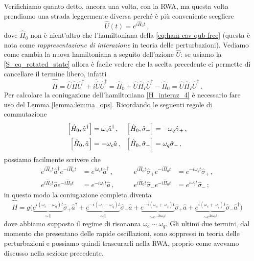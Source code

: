 \noindent Verifichiamo quanto detto, ancora una volta, con la RWA, ma questa volta prendiamo una strada leggermente diversa perché è più conveniente scegliere
\begin{equation*}
    \hat U(t) = e^{i\hat H_0 t} \, ,
\end{equation*}
dove $\hat H_0$ non è nient'altro che l'hamiltoniana della \eqref{eq:ham-cav-qub-free} (questa è nota come \textit{rappresentazione di interazione} in teoria delle perturbazioni). Vediamo come cambia la nuova hamiltoniana a seguito dell'azione $\hat U$: se usiamo la \eqref{S_eq_rotated_state} allora è facile vedere che la scelta precedente ci permette di cancellare il termine libero, infatti
\begin{equation*}
    \hat{\tilde{H}} = \hat U \hat H \hat U^\dagger + i\dot{\hat U}\hat U^\dagger=\hat H_0 + \hat U \hat H_I \hat U^\dagger - \hat H_0= \hat U \hat H_I \hat U^\dagger \, .
\end{equation*}
Per calcolare la coniugazione dell'hamiltoniana \eqref{H_interaz_4} è necessario fare uso del Lemma \ref{lemma:lemma_ops}. Ricordando le seguenti regole di commutazione
\begin{align*}
    \comm{\hat H_0}{\hat a^\dagger} &= \omega_c \hat a^\dagger \, , 
    &\comm{\hat H_0}{\hat \sigma_+} &= -\omega_q\hat \sigma_+ \, , \\
    \comm{\hat H_0}{\hat a} &= -\omega_c \hat a \, , &\comm{\hat H_0}{\hat \sigma_-} &= \omega_q\hat \sigma_- \, ,
\end{align*}
possiamo facilmente scrivere che
\begin{equation}\label{RWA_ops_trans}
    \begin{aligned}
    e^{i\hat H_0t} \hat a^\dagger e^{-i\hat H_0t} &= e^{i\omega_ct} \hat a^\dagger \, , \qquad
    &e^{i\hat H_0t} \hat \sigma_+ e^{-i\hat H_0t} &= e^{-i\omega_qt} \hat \sigma_+ \, , \\
    e^{i\hat H_0t} \hat a e^{-i\hat H_0t} &= e^{-i\omega_ct} \hat a \, , \qquad
    &e^{i\hat H_0t} \hat \sigma_- e^{-i\hat H_0t} &= e^{i\omega_qt} \hat \sigma_- \, ;
    \end{aligned}
\end{equation}
in questo modo la coniugazione completa diventa
\begin{equation*}
    \hat{\tilde{H}} = g \Big( 
    \underbrace{e^{i(\omega_c - \omega_q)t}}_{\sim 1}\hat \sigma_+\hat a^\dagger +
    \underbrace{e^{-i(\omega_c - \omega_q)t}}_{\sim 1}\hat \sigma_-\hat a +
    \underbrace{e^{-i(\omega_c + \omega_q)t}}_{\sim e^{-2i\omega_qt}}\hat \sigma_+\hat a +
    \underbrace{e^{i(\omega_c + \omega_q)t}}_{\sim e^{2i\omega_qt}}\hat \sigma_-\hat a^\dag
    \Big)
\end{equation*}
dove abbiamo supposto il regime di risonanza $\omega_c \sim \omega_q$. Gli ultimi due termini, dal momento che presentano delle rapide oscillazioni, sono soppressi in teoria delle perturbazioni e possiamo quindi trascurarli nella RWA, proprio come avevamo discusso nella sezione precedente.

